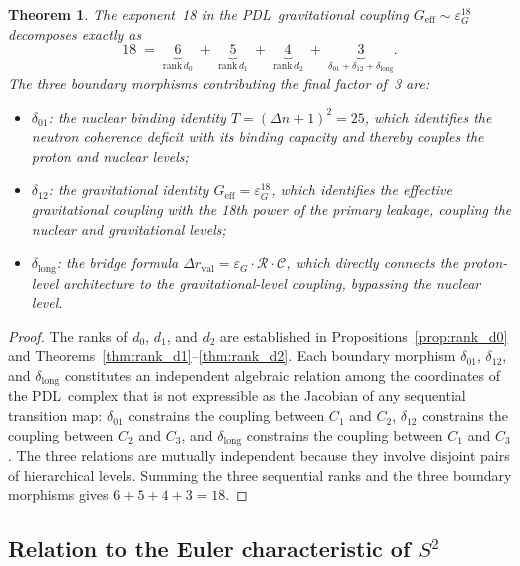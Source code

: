 \documentclass[11pt,a4paper]{article}
\newtheorem{theorem}{Theorem}[section]
\theoremstyle{definition}
\newcommand{\PDL}{\textnormal{PDL}}
\newcommand{\rval}{r_{\mathrm{val}}}
\newcommand{\epsg}{\varepsilon_G}
\newcommand{\rank}{\mathrm{rank}}
\newcommand{\dmap}[1]{d_{#1}}
\newcommand{\dlong}{\delta_{\mathrm{long}}}
\newcommand{\calR}{\mathcal{R}}
\newcommand{\calC}{\mathcal{C}}
\begin{document}
\begin{theorem}
  \label{thm:18_decomp}
  The exponent~18 in the \PDL\ gravitational coupling $G_{\mathrm{eff}} \sim \epsg^{18}$ decomposes exactly as
  \begin{equation}
    \label{eq:18_decomp}
    18 \;=\;
    \underbrace{6}_{\rank\,\dmap{0}}
    \;+\;
    \underbrace{5}_{\rank\,\dmap{1}}
    \;+\;
    \underbrace{4}_{\rank\,\dmap{2}}
    \;+\;
    \underbrace{3}_{\delta_{01} + \delta_{12} + \dlong}.
  \end{equation}
  The three boundary morphisms contributing the final factor of~3 are:
  \begin{itemize}
    \item $\delta_{01}$: the nuclear binding identity $T = (\Delta n + 1)^2 = 25$, which identifies the neutron coherence deficit with its binding capacity and thereby couples the proton and nuclear levels;\cite{Nuclear_Stability_PDL_2026}
    \item $\delta_{12}$: the gravitational identity $G_{\mathrm{eff}} = \epsg^{18}$, which identifies the effective gravitational coupling with the 18th power of the primary leakage, coupling the nuclear and gravitational levels;\cite{Exponent_18_PDL_2026}
    \item $\dlong$: the bridge formula $\Delta\rval = \epsg \cdot \calR \cdot \calC$, which directly connects the proton-level architecture to the gravitational-level coupling, bypassing the nuclear level.\cite{Bridge_Formula_PDL_2026}
  \end{itemize}
\end{theorem}

\begin{proof}
The ranks of $\dmap{0}$, $\dmap{1}$, and $\dmap{2}$ are established in Propositions~\ref{prop:rank_d0} and Theorems~\ref{thm:rank_d1}--\ref{thm:rank_d2}. Each boundary morphism $\delta_{01}$, $\delta_{12}$, and $\dlong$ constitutes an independent algebraic relation among the coordinates of the \PDL\ complex that is not expressible as the Jacobian of any sequential transition map: $\delta_{01}$ constrains the coupling between $C_1$ and $C_2$, $\delta_{12}$ constrains the coupling between $C_2$ and $C_3$, and $\dlong$ constrains the coupling between $C_1$ and $C_3$. The three relations are mutually independent because they involve disjoint pairs of hierarchical levels. Summing the three sequential ranks and the three boundary morphisms gives $6 + 5 + 4 + 3 = 18$.
\end{proof}

\subsection{Relation to the Euler characteristic of \texorpdfstring{$S^2$}{S2}}
\label{subsec:euler}
\end{document}
